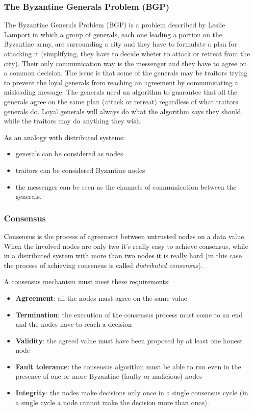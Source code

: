 \subsubsection{The Byzantine Generals Problem (BGP)}
The Byzantine Generals Problem (BGP) is a problem described by Leslie Lamport
\cite{lamport1982byzantine} in which a group of generals, each one leading a portion
on the Byzantine army, are surrounding a city and they have to formulate a plan
for attacking it (simplifying, they have to decide wheter to attack or retreat
from the city). Their only communication way is the messenger and they have to
agree on a common decision. The issue is that some of the generals may be
traitors trying to prevent the loyal generals from reaching an agreement by
communicating a misleading message. The generals need an algorithm to guarantee
that all the generals agree on the same plan (attack or retreat) regardless of what
traitors generals do. Loyal generals will always do what the algorithm says they
should, while the traitors may do anything they wish.

As an analogy with distributed systems:
\begin{itemize}
  \item generals can be considered as nodes
  \item traitors can be considered Byzantine nodes
  \item the messenger can be seen as the channels of communication between the generals.
\end{itemize}

\subsubsection{Consensus}
Consensus is the process of agreement between untrusted nodes on a data value.
When the involved nodes are only two it's really easy to achieve consensus, while
in a distributed system with more than two nodes it is really hard (in this case
the process of achieving consensus is called \emph{distributed consensus}).

A consensus mechanism must meet these requirements:
\begin{itemize}
  \item \textbf{Agreement}: all the nodes must agree on the same value
  \item \textbf{Termination}: the execution of the consensus process must come
  to an end and the nodes have to reach a decision
  \item \textbf{Validity}: the agreed value must have been proposed by at least
  one honest node
  \item \textbf{Fault tolerance}: the consensus algorithm must be able to run even
  in the presence of one or more Byzantine (faulty or malicious) nodes
  \item \textbf{Integrity}: the nodes make decisions only once in a single
  consensus cycle (in a single cycle a node cannot make the decision more than once).
\end{itemize}
